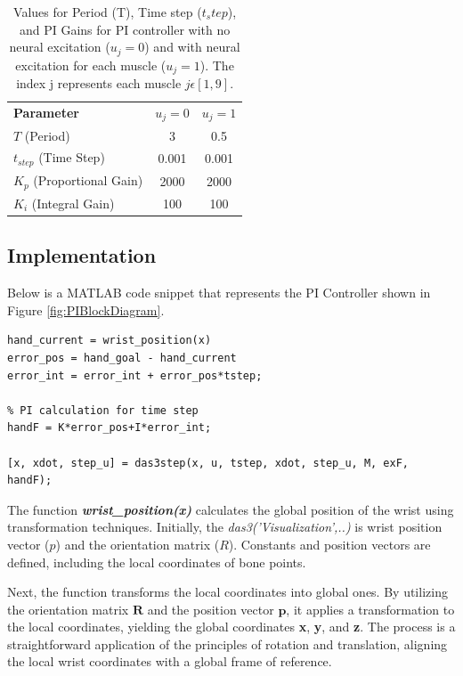 \begin{table}[h]
    \centering
    \caption{Values for Period (T), Time step ($t_step$), and PI Gains for PI controller with no neural excitation ($u_j=0$) and with neural excitation for each muscle ($u_j = 1$). The index j represents each muscle $j \epsilon[1,9]$.}
    \begin{tabular}{|l|c|c|}
        \hline
        \textbf{Parameter} & \textbf{$u_j=0$} & \textbf{$u_j=1$} \\
        \(T\) (Period) & 3 & 0.5 \\
        \(t_{step}\) (Time Step) & 0.001 & 0.001 \\
        \( K_p \) (Proportional Gain) & 2000 & 2000\\
        \( K_i \) (Integral Gain)     & 100 & 100 \\
        \hline
    \end{tabular}

    \label{tab:PI}
\end{table}

\newpage
\subsection{Implementation}

Below is a MATLAB code snippet that represents the PI Controller shown in Figure \ref{fig:PIBlockDiagram}. 

\begin{lstlisting}[style=Matlab-editor]
hand_current = wrist_position(x)
error_pos = hand_goal - hand_current
error_int = error_int + error_pos*tstep;

% PI calculation for time step
handF = K*error_pos+I*error_int;

[x, xdot, step_u] = das3step(x, u, tstep, xdot, step_u, M, exF, handF);
\end{lstlisting}

The function \textbf{\textit{wrist\_position(x)}} calculates the global position of the wrist using transformation techniques. Initially, the \textit{das3('Visualization',..)} is wrist position vector ($p$) and the orientation matrix ($R$). Constants and position vectors are defined, including the local coordinates of bone points.

Next, the function transforms the local coordinates into global ones. By utilizing the orientation matrix $\textbf{R}$ and the position vector $\textbf{p}$, it applies a transformation to the local coordinates, yielding the global coordinates \textbf{x}, \textbf{y}, and \textbf{z}. The process is a straightforward application of the principles of rotation and translation, aligning the local wrist coordinates with a global frame of reference.

